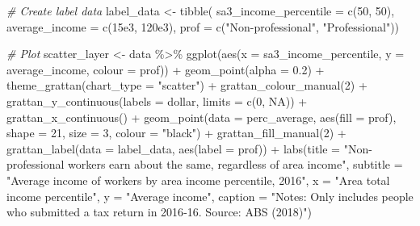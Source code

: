 \documentclass[
]{book}
\newenvironment{Shaded}{\begin{snugshade}}{\end{snugshade}}
\newcommand{\AttributeTok}[1]{\textcolor[rgb]{0.77,0.63,0.00}{#1}}
\newcommand{\CommentTok}[1]{\textcolor[rgb]{0.56,0.35,0.01}{\textit{#1}}}
\newcommand{\ConstantTok}[1]{\textcolor[rgb]{0.00,0.00,0.00}{#1}}
\newcommand{\DecValTok}[1]{\textcolor[rgb]{0.00,0.00,0.81}{#1}}
\newcommand{\FloatTok}[1]{\textcolor[rgb]{0.00,0.00,0.81}{#1}}
\newcommand{\FunctionTok}[1]{\textcolor[rgb]{0.00,0.00,0.00}{#1}}
\newcommand{\NormalTok}[1]{#1}
\newcommand{\OtherTok}[1]{\textcolor[rgb]{0.56,0.35,0.01}{#1}}
\newcommand{\SpecialCharTok}[1]{\textcolor[rgb]{0.00,0.00,0.00}{#1}}
\newcommand{\StringTok}[1]{\textcolor[rgb]{0.31,0.60,0.02}{#1}}
\begin{document}
\begin{Shaded}
\begin{Highlighting}[]
\CommentTok{\# Create label data}
\NormalTok{label\_data }\OtherTok{\textless{}{-}} \FunctionTok{tibble}\NormalTok{(}
  \AttributeTok{sa3\_income\_percentile =} \FunctionTok{c}\NormalTok{(}\DecValTok{50}\NormalTok{, }\DecValTok{50}\NormalTok{),}
  \AttributeTok{average\_income =} \FunctionTok{c}\NormalTok{(}\FloatTok{15e3}\NormalTok{, }\FloatTok{120e3}\NormalTok{),}
  \AttributeTok{prof =}  \FunctionTok{c}\NormalTok{(}\StringTok{"Non{-}professional"}\NormalTok{, }\StringTok{"Professional"}\NormalTok{))}


\CommentTok{\# Plot }
\NormalTok{scatter\_layer }\OtherTok{\textless{}{-}}\NormalTok{ data }\SpecialCharTok{\%\textgreater{}\%} 
  \FunctionTok{ggplot}\NormalTok{(}\FunctionTok{aes}\NormalTok{(}\AttributeTok{x =}\NormalTok{ sa3\_income\_percentile,}
             \AttributeTok{y =}\NormalTok{ average\_income,}
             \AttributeTok{colour =}\NormalTok{ prof)) }\SpecialCharTok{+}
  \FunctionTok{geom\_point}\NormalTok{(}\AttributeTok{alpha =} \FloatTok{0.2}\NormalTok{) }\SpecialCharTok{+} 
  \FunctionTok{theme\_grattan}\NormalTok{(}\AttributeTok{chart\_type =} \StringTok{"scatter"}\NormalTok{) }\SpecialCharTok{+} 
  \FunctionTok{grattan\_colour\_manual}\NormalTok{(}\DecValTok{2}\NormalTok{) }\SpecialCharTok{+} 
  \FunctionTok{grattan\_y\_continuous}\NormalTok{(}\AttributeTok{labels =}\NormalTok{ dollar, }
                       \AttributeTok{limits =} \FunctionTok{c}\NormalTok{(}\DecValTok{0}\NormalTok{, }\ConstantTok{NA}\NormalTok{)) }\SpecialCharTok{+} 
  \FunctionTok{grattan\_x\_continuous}\NormalTok{() }\SpecialCharTok{+} 
  \FunctionTok{geom\_point}\NormalTok{(}\AttributeTok{data =}\NormalTok{ perc\_average,}
             \FunctionTok{aes}\NormalTok{(}\AttributeTok{fill =}\NormalTok{ prof),}
             \AttributeTok{shape =} \DecValTok{21}\NormalTok{,}
             \AttributeTok{size =} \DecValTok{3}\NormalTok{, }
             \AttributeTok{colour =} \StringTok{"black"}\NormalTok{) }\SpecialCharTok{+} 
  \FunctionTok{grattan\_fill\_manual}\NormalTok{(}\DecValTok{2}\NormalTok{) }\SpecialCharTok{+} 
  \FunctionTok{grattan\_label}\NormalTok{(}\AttributeTok{data =}\NormalTok{ label\_data,}
                \FunctionTok{aes}\NormalTok{(}\AttributeTok{label =}\NormalTok{ prof)) }\SpecialCharTok{+} 
  \FunctionTok{labs}\NormalTok{(}\AttributeTok{title =} \StringTok{"Non{-}professional workers earn about the same, regardless of area income"}\NormalTok{,}
       \AttributeTok{subtitle =} \StringTok{"Average income of workers by area income percentile, 2016"}\NormalTok{,}
       \AttributeTok{x =} \StringTok{"Area total income percentile"}\NormalTok{,}
       \AttributeTok{y =} \StringTok{"Average income"}\NormalTok{,}
       \AttributeTok{caption =} \StringTok{"Notes: Only includes people who submitted a tax return in 2016{-}16. Source: ABS (2018)"}\NormalTok{)}
\end{Highlighting}
\end{Shaded}
\end{document}

